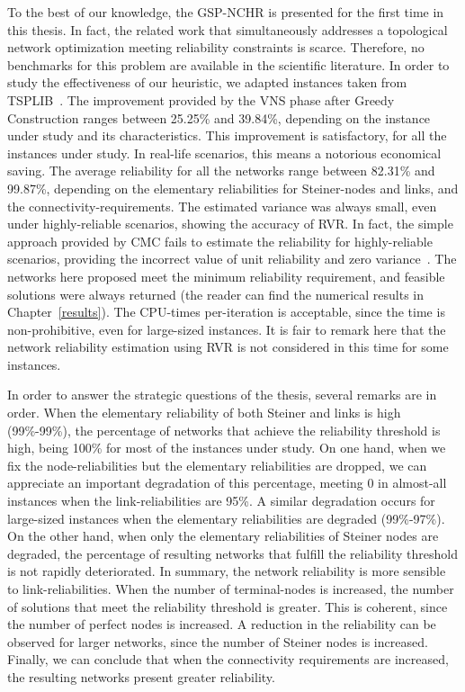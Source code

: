 To the best of our knowledge, the GSP-NCHR is presented for the first time in this thesis. 
In fact, the related work that simultaneously addresses a topological network optimization meeting 
reliability constraints is scarce. Therefore, no benchmarks for this problem are available in the scientific literature. In order to study the effectiveness of our heuristic, we adapted instances taken from TSPLIB~\cite{24}. The improvement provided by the VNS phase after Greedy Construction ranges between 25.25\% and 39.84\%, 
depending on the instance under study and its characteristics. This improvement is satisfactory, for 
all the instances under study. In real-life scenarios, this means a notorious economical saving. The average reliability for all the networks range between 82.31\% and 99.87\%, depending on the elementary reliabilities 
for Steiner-nodes and links, and the connectivity-requirements. The estimated variance was always small, 
even under highly-reliable scenarios, showing the accuracy of RVR. In fact, the simple approach provided by CMC 
fails to estimate the reliability for highly-reliable scenarios, providing the incorrect value of unit reliability and zero variance~\cite{4}. The networks here proposed meet the minimum reliability requirement, and 
feasible solutions were always returned (the reader can find the numerical results in Chapter~\ref{results}). 
The CPU-times per-iteration is acceptable, since the time is non-prohibitive, even for large-sized instances. 
It is fair to remark here that the network reliability estimation using RVR is not considered in this time for some instances. 

In order to answer the strategic questions of the thesis, several remarks are in order. 
When the elementary reliability of both Steiner and links is high (99\%-99\%), the percentage of networks 
that achieve the reliability threshold is high, being 100\% for most of the instances under study. 
On one hand, when we fix the node-reliabilities but the elementary reliabilities are dropped, we can appreciate an important degradation of this percentage, meeting 0 in almost-all instances when the link-reliabilities are 95\%. A similar degradation occurs for large-sized instances when the elementary reliabilities are degraded (99\%-97\%).
On the other hand, when only the elementary reliabilities of Steiner nodes are degraded, the percentage of resulting networks that fulfill the reliability threshold is not rapidly deteriorated. In summary, the network reliability is more sensible to link-reliabilities. 
When the number of terminal-nodes is increased, the number of solutions that meet the reliability threshold is greater. This is coherent, since the number of perfect nodes is increased. A reduction in 
the reliability can be observed for larger networks, since the number of Steiner nodes is increased. Finally, we can conclude that when the connectivity requirements are increased, the resulting networks 
present greater reliability. 
